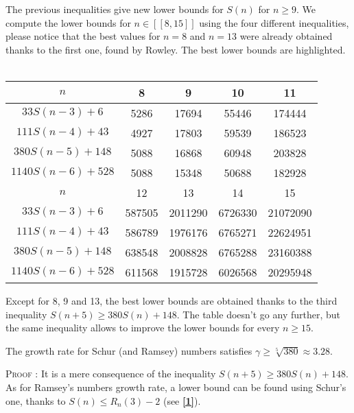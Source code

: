 The previous inequalities give new lower bounds for \(S(n)\) for
\( n \geqslant 9 \). We compute the lower
bounds for \( n \in [\![8,15]\!] \) using the four different inequalities, please notice that the best values for \( n = 8\) and \(n = 13\) were already obtained thanks to the first one, found by Rowley. The best lower bounds are highlighted.\\
\\
\begin{center}
\begin{tabular}{|*{5}{c|}}
    \hline
	\(n\) & 8 & 9 & 10 & 11 \\
	\hline
	\(33S(n-3) + 6 \) & \cellcolor{yellow} 5286 & 17694 & 55446 & 174444\\
	\hline
	\(111S(n-4) + 43 \) & 4927 & \cellcolor{yellow} 17803 & 59539 & 186523\\
	\hline
	\(380S(n-5) + 148 \) & 5088 & 16868 & \cellcolor{yellow} 60948 & \cellcolor{yellow} 203828 \\
	\hline
	\(1140S(n-6) + 528 \) & 5088 & 15348 & 50688 & 182928\\
	\hline
	\hline
	\(n\) & 12 & 13 & 14 & 15 \\
	\hline
	\(33S(n-3) + 6 \) & 587505 & \cellcolor{yellow} 2011290 & 6726330 & 21072090\\
	\hline
	\(111S(n-4) + 43 \) & 586789 & 1976176 & 6765271 & 22624951 \\
	\hline
	\(380S(n-5) + 148 \) & \cellcolor{yellow} 638548 & 2008828 & \cellcolor{yellow} 6765288 & \cellcolor{yellow} 23160388 \\
	\hline
	\(1140S(n-6) + 528 \) & 611568 & 1915728 & 6026568 & 20295948 \\
	\hline
\end{tabular}
\end{center}
Except for 8, 9 and 13, the best lower bounds are obtained thanks to
the third inequality \( S(n+5) \geqslant 380S(n) + 148\). The table
doesn't go any further, but the same inequality allows to improve the
lower bounds for every \( n \geqslant 15 \). 

\begin{corollary}
The growth rate for Schur (and Ramsey) numbers satisfies \(\gamma \geqslant \sqrt[5]{380} \approx 3.28 \).
\end{corollary}
\textsc{Proof :} It is a mere consequence of the inequality \( S(n+5) \geqslant 380S(n) + 148\). As for Ramsey's 
numbers growth rate, a lower bound can be found using Schur's one, thanks to \(S(n) \leqslant R_n(3)-2 \) 
(see \hyperlink{label1}{\textbf{[1]}}).
